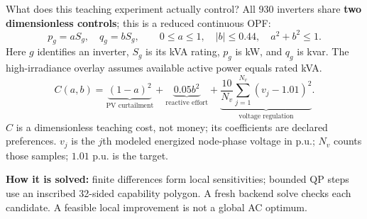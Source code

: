 \begin{frame}[t]{What does this teaching experiment actually control?}
\small
All 930 inverters share \textbf{two dimensionless controls}; this is a reduced continuous OPF:
\[
p_g=aS_g,\quad q_g=bS_g,\qquad
0\leq a\leq1,\quad |b|\leq0.44,\quad a^2+b^2\leq1.
\]
Here $g$ identifies an inverter, $S_g$ is its kVA rating, $p_g$ is kW, and $q_g$ is kvar. The high-irradiance overlay assumes available active power equals rated kVA.
\[
C(a,b)=\underbrace{(1-a)^2}_{\text{PV curtailment}}+
\underbrace{0.05b^2}_{\text{reactive effort}}+
\underbrace{\frac{10}{N_v}\sum_{j=1}^{N_v}(v_j-1.01)^2}_{\text{voltage regulation}}.
\]
\footnotesize $C$ is a dimensionless teaching cost, not money; its coefficients are declared preferences. $v_j$ is the $j$th modeled energized node-phase voltage in p.u.; $N_v$ counts those samples; $1.01$ p.u. is the target.
\smallskip\par\small
\textbf{How it is solved:} finite differences form local sensitivities; bounded QP steps use an inscribed 32-sided capability polygon. A fresh backend solve checks each candidate. A feasible local improvement is not a global AC optimum.
\end{frame}

